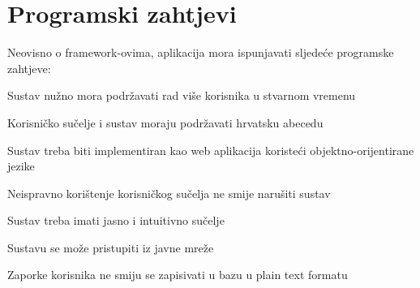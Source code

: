	\bigskip

	\section{Programski zahtjevi}
	Neovisno o framework-ovima, aplikacija mora ispunjavati sljedeće programske zahtjeve:

		\begin{packed_item}

			\item Sustav nužno mora podržavati rad više korisnika u stvarnom vremenu
			\item Korisničko sučelje i sustav moraju podržavati hrvatsku abecedu
			\item Sustav treba biti implementiran kao web aplikacija koristeći objektno-orijentirane jezike
			\item Neispravno korištenje korisničkog sučelja ne smije narušiti sustav
			\item Sustav treba imati jasno i intuitivno sučelje
			\item Sustavu se može pristupiti iz javne mreže
			\item Zaporke korisnika ne smiju se zapisivati u bazu u plain text formatu

		\end{packed_item}
